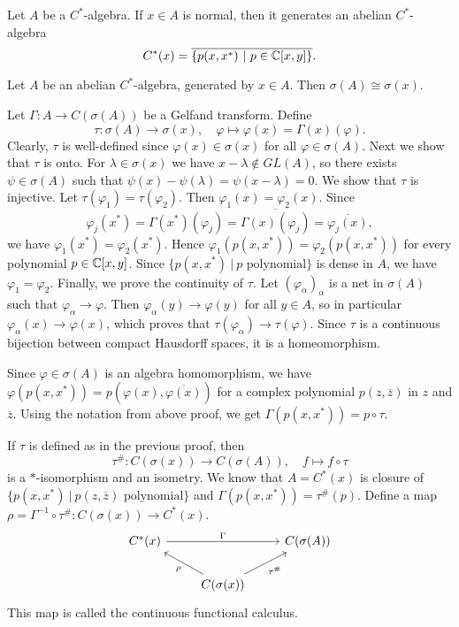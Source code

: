 \begin{remark}
  Let $A$ be a $C^*$-algebra. If $x \in A$ is normal, then it generates an abelian $C^*$-algebra
  $$C^* (x) = \overline{\{p(x, x^*)\ |\ p \in \mathbb {C}[x, y]\}}.$$
\end{remark}

\begin{corollary}
  Let $A$ be an abelian $C^*$-algebra, generated by $x \in A$. Then $\sigma (A) \cong \sigma(x)$.
\end{corollary}

\begin{myproof}
  Let $\Gamma: A \to C(\sigma(A))$ be a Gelfand transform.
  Define $$\tau: \sigma(A) \to \sigma(x),\quad \varphi \mapsto \varphi(x) = \Gamma(x) (\varphi).$$
  Clearly, $\tau$ is well-defined since $\varphi(x) \in \sigma (x)$ for all $\varphi \in \sigma (A)$.
  Next we show that $\tau$ is onto. For $\lambda \in \sigma(x)$ we have
  $x - \lambda \notin GL(A)$, so there exists $\psi \in \sigma(A)$ such that $\psi(x) - \psi (\lambda) = \psi (x - \lambda) = 0$.
  We show that $\tau$ is injective. Let $\tau (\varphi_1) = \tau(\varphi_2)$.
  Then $\varphi_1(x) = \varphi_2(x)$. Since 
  $$\varphi_j (x^*) = \Gamma(x^*) (\varphi_j) = \overline{\Gamma(x)(\varphi_j)} = \overline{\varphi_j(x)},$$
  we have $\varphi_1(x^*) = \varphi_2(x^*)$. Hence $\varphi_1 (p(x, x^*)) = \varphi_2(p(x, x^*))$ for every polynomial $p \in \mathbb {C} [x, y]$.
  Since $\{p(x, x^*)\ |\ \textrm{$p$ polynomial}\}$ is dense in $A$, we have $\varphi_1 = \varphi_2$.
  Finally, we prove the continuity of $\tau$. Let $(\varphi_\alpha)_{\alpha}$ is a net in $\sigma(A)$ such that $\varphi_\alpha \to \varphi$.
  Then $\varphi_\alpha(y) \to \varphi(y)$ for all $y \in A$, so in particular $\varphi_\alpha (x) \to \varphi(x)$,
  which proves that $\tau (\varphi_\alpha) \to \tau(\varphi)$. Since $\tau$ is a continuous bijection between compact
  Hausdorff spaces, it is a homeomorphism.
\end{myproof}

\begin{remark}
  Since $\varphi \in \sigma(A)$ is an algebra homomorphism, we have $\varphi(p(x, x^*)) = p(\varphi(x), \overline{\varphi(x)})$
  for a complex polynomial $p(z, \overline{z})$ in $z$ and $\overline{z}$. Using the notation from above proof, 
  we get $\Gamma (p(x, x^*)) = p \circ \tau$.
\end{remark}

If $\tau$ is defined as in the previous proof, then $$\tau^{\#}: C(\sigma(x)) \to C(\sigma(A)),\quad f \mapsto f \circ \tau$$
is a $*$-isomorphism and an isometry. We know that $A = C^*(x)$ is closure of $\{p(x, x^*)\ |\ \textrm{$p (z, \overline{z})$ polynomial}\}$
and $\Gamma (p(x, x^*)) = \tau^{\#} (p)$. Define a map $\rho = \Gamma^{-1} \circ \tau^{\#}: C(\sigma(x)) \to C^*(x)$.
\[\begin{tikzcd}
	{C^*(x)} && {C(\sigma(A))} \\
	& {C(\sigma(x))}
	\arrow["{\tau^{\#}}"', from=2-2, to=1-3]
	\arrow["\rho", from=2-2, to=1-1]
	\arrow["\Gamma", from=1-1, to=1-3]
\end{tikzcd}\]
This map is called the continuous functional calculus.

